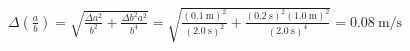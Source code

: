 \documentclass[
a4paper, %
11pt, %
parskip=half, %
headings=standardclasses, %
numbers=noenddot, %
headsepline, %
captions=tableheading, %
ngerman %
]{scrartcl}
\begin{document}
	\begin{align}
		\Delta\left(\frac{a}{b}\right)=\sqrt{\frac{\Delta a^{2}}{b^{2}} + \frac{\Delta b^{2} a^{2}}{b^{4}}}=\sqrt{\frac{\left(\SI{0.1}{\meter}\right)^{2}}{\left(\SI{2.0}{\second}\right)^{2}} + \frac{\left(\SI{0.2}{\second}\right)^{2} \left(\SI{1.0}{\meter}\right)^{2}}{\left(\SI{2.0}{\second}\right)^{4}}}=\SI{0.08}{\meter\per\second}
	\end{align}
\end{document}
